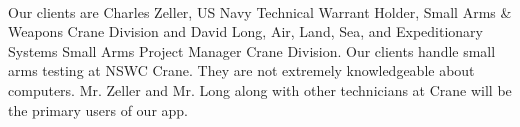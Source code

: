 \paragraph{} Our clients are Charles Zeller, US Navy Technical Warrant Holder, Small Arms \& Weapons Crane Division and David Long, Air, Land, Sea, and Expeditionary Systems Small Arms Project Manager Crane Division. Our clients handle small arms testing at NSWC Crane. They are not extremely knowledgeable about computers. Mr. Zeller and Mr. Long along with other technicians at Crane will be the primary users of our app.